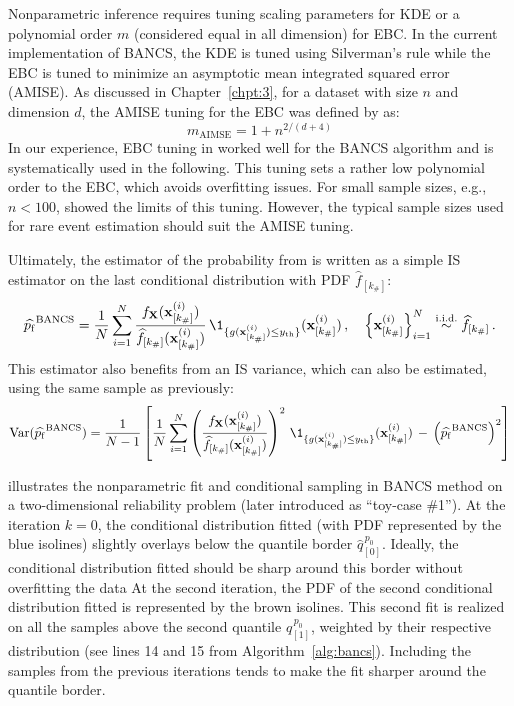 Nonparametric inference requires tuning scaling parameters for KDE or a polynomial order $m$ (considered equal in all dimension) for EBC. 
In the current implementation of BANCS, the KDE is tuned using Silverman's rule \citep{silverman_1981} while the EBC is tuned to minimize an asymptotic mean integrated squared error (AMISE). 
As discussed in Chapter~\ref{chpt:3}, for a dataset with size $n$ and dimension $d$, the AMISE tuning for the EBC was defined by \citet{sancetta_satchell_2004} as:
\begin{equation}\label{eq:amise_tuning}
    m_{\mathrm{AIMSE}} = 1 + n^{2/(d+4)}
\end{equation}
In our experience, EBC tuning in  worked well for the BANCS algorithm and is systematically used in the following. 
This tuning sets a rather low polynomial order to the EBC, which avoids overfitting issues. 
For small sample sizes, e.g., $n<100$, \citet{segers_2017} showed the limits of this tuning. 
However, the typical sample sizes used for rare event estimation should suit the AMISE tuning. 

Ultimately, the estimator of the probability from  is written as a simple IS estimator on the last conditional distribution with PDF $\widehat{f}_{[k_\#]}$:
\begin{equation}
    \widehat{\pf}^{\mathrm{BANCS}} = \frac1N \sum_{i=1}^N \frac{f_\bX(\bx_{[k_\#]}^{(i)})}{\widehat{f}_{[k_\#]}(\bx_{[k_\#]}^{(i)})} \, \1_{\{g(\bx_{[k_\#]}^{(i)}) \leq \yth \}}(\bx_{[k_\#]}^{(i)})\, , \quad \left\{\bx_{[k_\#]}^{(i)}\right\}_{i=1}^N  \overset{\text{i.i.d.}}{\sim} \widehat{f}_{[k_\#]} \, .
\end{equation}
This estimator also benefits from an IS variance, which can also be estimated, using the same sample as previously:
\begin{equation}
    \var(\widehat{\pf}^{\mathrm{BANCS}}) = \frac{1}{N-1} \left[\frac1N \sum_{i=1}^N \left(\frac{f_\bX(\bx_{[k_\#]}^{(i)})}{\widehat{f}_{[k_\#]}(\bx_{[k_\#]}^{(i)})}\right)^2 \, \1_{\{g(\bx_{[k_\#]}^{(i)}) \leq \yth \}}(\bx_{[k_\#]}^{(i)}) \, - \, \left(\widehat{\pf}^{\mathrm{BANCS}}\right)^2\right]
\end{equation}

 illustrates the nonparametric fit and conditional sampling in BANCS method on a two-dimensional reliability problem (later introduced as ``toy-case \#1''). 
At the iteration $k=0$, the conditional distribution fitted (with PDF represented by the blue isolines) slightly overlays below the quantile border $\widehat{q}_{[0]}^{\, p_0}$. 
Ideally, the conditional distribution fitted should be sharp around this border without overfitting the data
At the second iteration, the PDF of the second conditional distribution fitted is represented by the brown isolines. 
This second fit is realized on all the samples above the second quantile $\widehat{q}_{[1]}^{\, p_0}$, weighted by their respective distribution (see lines 14 and 15 from Algorithm~\ref{alg:bancs}). 
Including the samples from the previous iterations tends to make the fit sharper around the quantile border. 


